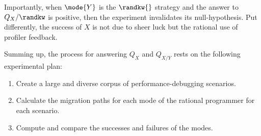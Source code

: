 Importantly, when $\mode{Y}$ is the $\randkw{}$ strategy and the answer to
$Q_X/\randkw$ is positive, then the experiment invalidates its null-hypothesis.
Put differently, the success of $X$ is not due to sheer luck but the rational
use of profiler feedback.

Summing up, the process for answering $Q_X$ and $Q_{X/Y}$ rests on the following
experimental plan:
\begin{enumerate}

\item Create a large and diverse corpus of performance-debugging scenarios.

\item Calculate the migration paths for each mode of the rational programmer for
  each scenario.

\item Compute and compare the successes and failures of the modes.

\end{enumerate}


